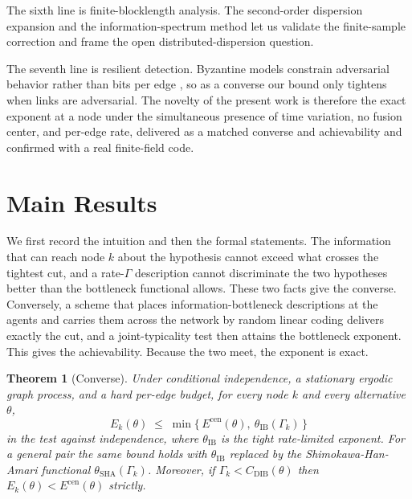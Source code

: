 \documentclass[journal]{IEEEtran}
\newtheorem{theorem}{Theorem}
\theoremstyle{definition}
\theoremstyle{remark}
\newcommand{\Ecen}{E^{\mathrm{cen}}}
\newcommand{\tib}{\theta_{\mathrm{IB}}}
\newcommand{\tsha}{\theta_{\mathrm{SHA}}}
\newcommand{\Gk}{\Gamma_k}
\newcommand{\Cdib}{C_{\mathrm{DIB}}}
\begin{document}
The sixth line is finite-blocklength analysis. The second-order dispersion expansion
\cite{strassen1962,ppv2010} and the information-spectrum method \cite{han2003,verduhan1994} let us validate the
finite-sample correction and frame the open distributed-dispersion question.

The seventh line is resilient detection. Byzantine models constrain adversarial behavior rather than bits per
edge \cite{vempaty2013}, so as a converse our bound only tightens when links are adversarial. The novelty of the
present work is therefore the exact exponent at a node under the simultaneous presence of time variation, no
fusion center, and per-edge rate, delivered as a matched converse and achievability and confirmed with a real
finite-field code.

\section{Main Results}\label{sec:results}
We first record the intuition and then the formal statements. The information that can reach node $k$ about the
hypothesis cannot exceed what crosses the tightest cut, and a rate-$\Gamma$ description cannot discriminate the
two hypotheses better than the bottleneck functional allows. These two facts give the converse. Conversely, a
scheme that places information-bottleneck descriptions at the agents and carries them across the network by random
linear coding delivers exactly the cut, and a joint-typicality test then attains the bottleneck exponent. This
gives the achievability. Because the two meet, the exponent is exact.

\begin{theorem}[Converse]\label{thm:converse}
Under conditional independence, a stationary ergodic graph process, and a hard per-edge budget, for every node
$k$ and every alternative $\theta$,
\begin{equation}
E_k(\theta) \;\le\; \min\{\,\Ecen(\theta),\ \tib(\Gk)\,\}
\end{equation}
in the test against independence, where $\tib$ is the tight rate-limited exponent. For a general pair the same
bound holds with $\tib$ replaced by the Shimokawa-Han-Amari functional $\tsha(\Gk)$. Moreover, if
$\Gk<\Cdib(\theta)$ then $E_k(\theta)<\Ecen(\theta)$ strictly.
\end{theorem}
\end{document}
